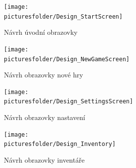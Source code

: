 \documentclass[12pt,a4paper]{article}
\def\picturesfolder{obrazky}
\begin{document}
\begin{figure}
\begin{center}
  \texttt{[image: \\picturesfolder/Design\_StartScreen]}
  \caption{Návrh úvodní obrazovky}
  \label{screen:intro}
\end{center}
\end{figure}

\begin{figure}
\begin{center}
  \texttt{[image: \\picturesfolder/Design\_NewGameScreen]}
  \caption{Návrh obrazovky nové hry}
  \label{screen:newgame}
\end{center}
\end{figure}

\begin{figure}
\begin{center}
  \texttt{[image: \\picturesfolder/Design\_SettingsScreen]}
  \caption{Návrh obrazovky nastavení}
  \label{screen:settings}
\end{center}
\end{figure}

\begin{figure}
\begin{center}
  \texttt{[image: \\picturesfolder/Design\_Inventory]}
  \caption{Návrh obrazovky inventáře}
  \label{screen:inventory}
\end{center}
\end{figure}
\end{document}
